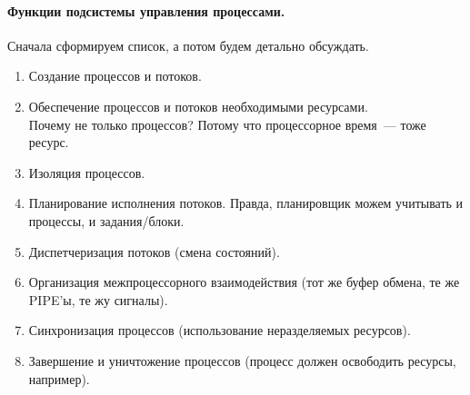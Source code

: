 \documentclass{article}
\begin{document}
    \paragraph{Функции подсистемы управления процессами.}
    Сначала сформируем список, а потом будем детально обсуждать.
    \begin{enumerate}
        \item Создание процессов и потоков.
        \item Обеспечение процессов и потоков необходимыми ресурсами.\\
        Почему не только процессов? Потому что процессорное время~--- тоже ресурс.
        \item Изоляция процессов.
        \item Планирование исполнения потоков. Правда, планировщик можем учитывать и процессы, и задания/блоки.
        \item Диспетчеризация потоков (смена состояний).
        \item Организация межпроцессорного взаимодействия (тот же буфер обмена, те же PIPE'ы, те жу сигналы).
        \item Синхронизация процессов (использование неразделяемых ресурсов).
        \item Завершение и уничтожение процессов (процесс должен освободить ресурсы, например).
    \end{enumerate}
\end{document}
